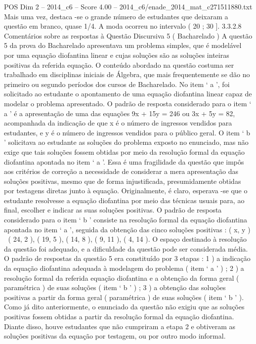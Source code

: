 \begin{textsample}{POS Dim 2 – 2014\_c6 – Score 4.00 – 2014\_c6/enade\_2014\_mat\_c271511880.txt}
Mais uma vez, destaca -se o grande número de estudantes que deixaram a questão em branco, quase 1/4.
A moda ocorreu no intervalo ( 20 ; 30 ]. 3.3.2.8 Comentários sobre as respostas à Questão Discursiva 5 ( Bacharelado ) A questão 5 da prova do Bacharelado apresentava um problema simples, que é modelável por uma equação diofantina linear e cujas soluções são as soluções inteiras positivas da referida equação.
O conteúdo abordado na questão costuma ser trabalhado em disciplinas iniciais de Álgebra, que mais frequentemente se dão no primeiro ou segundo períodos dos cursos de Bacharelado.
No item ‘ a ’, foi solicitado ao estudante o apontamento de uma equação diofantina linear capaz de modelar o problema apresentado.
O padrão de resposta considerado para o item ‘ a ’ é a apresentação de uma das equações 9x + 15y = 246 ou 3x + 5y = 82, acompanhada da indicação de que x é o número de ingressos vendidos para estudantes, e y é o número de ingressos vendidos para o público geral.
O item ‘ b ’ solicitava ao estudante as soluções do problema exposto no enunciado, mas não exige que tais soluções fossem obtidas por meio da resolução formal da equação diofantina apontada no item ‘ a ’.
Essa é uma fragilidade da questão que impôs aos critérios de correção a necessidade de considerar a mera apresentação das soluções positivas, mesmo que de forma injustificada, presumidamente obtidas por testagens diretas junto à equação.
Originalmente, é claro, esperava -se que o estudante resolvesse a equação diofantina por meio das técnicas usuais para, ao final, escolher e indicar as suas soluções positivas.
O padrão de resposta considerado para o item ‘ b ’ consiste na resolução formal da equação diofantina apontada no item ‘ a ’, seguida da obtenção das cinco soluções positivas : ( x, y )  ( 24, 2 ), ( 19, 5 ), ( 14, 8 ), ( 9, 11 ), ( 4, 14 ).
O espaço destinado à resolução da questão foi adequado, e a dificuldade da questão pode ser considerada média.
O padrão de respostas da questão 5 era constituído por 3 etapas : 1 ) a indicação da equação diofantina adequada à modelagem do problema ( item ‘ a ’ ) ; 2 ) a resolução formal da referida equação diofantina e a obtenção da forma geral ( paramétrica ) de suas soluções ( item ‘ b ’ ) ; 3 ) a obtenção das soluções positivas a partir da forma geral ( paramétrica ) de suas soluções ( item ‘ b ’ ).
Como já dito anteriormente, o enunciado da questão não exigiu que as soluções positivas fossem obtidas a partir da resolução formal da equação diofantina.
Diante disso, houve estudantes que não cumpriram a etapa 2 e obtiveram as soluções positivas da equação por testagem, ou por outro modo informal.

\end{textsample}
